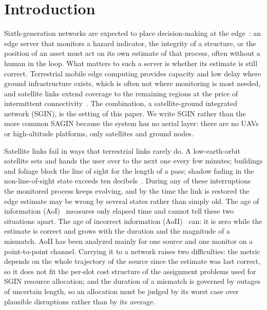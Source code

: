 \section{Introduction}

Sixth-generation networks are expected to place decision-making at the edge~\cite{Saad2020}: an edge server that
monitors a hazard indicator, the integrity of a structure, or the position of an asset must act on its own estimate of
that process, often without a human in the loop. What matters to such a server is whether its estimate is still
correct. Terrestrial mobile edge computing provides capacity and low delay where ground infrastructure exists, which is
often not where monitoring is most needed, and satellite links extend coverage to the remaining regions at the price of
intermittent connectivity~\cite{Giordani2021}. The combination, a satellite-ground integrated network (SGIN), is the
setting of this paper. We write SGIN rather than the more common SAGIN because the system has no aerial layer: there
are no UAVs or high-altitude platforms, only satellites and ground nodes.

Satellite links fail in ways that terrestrial links rarely do. A low-earth-orbit satellite sets and hands the user over
to the next one every few minutes; buildings and foliage block the line of sight for the length of a pass; shadow
fading in the non-line-of-sight state exceeds ten decibels~\cite{TR38811}. During any of these interruptions the
monitored process keeps evolving, and by the time the link is restored the edge estimate may be wrong by several
states rather than simply old. The age of information (AoI)~\cite{Kaul2012, Yates2021} measures only elapsed time and
cannot tell these two situations apart. The age of incorrect information (AoII)~\cite{Maatouk2020, Maatouk2023} can:
it is zero while the estimate is correct and grows with the duration and the magnitude of a mismatch. AoII has been
analyzed mainly for one source and one monitor on a point-to-point channel. Carrying it to a network raises two
difficulties: the metric depends on the whole trajectory of the source since the estimate was last correct, so it does
not fit the per-slot cost structure of the assignment problems used for SGIN resource allocation; and the duration
of a mismatch is governed by outages of uncertain length, so an allocation must be judged by its worst case over
plausible disruptions rather than by its average.

